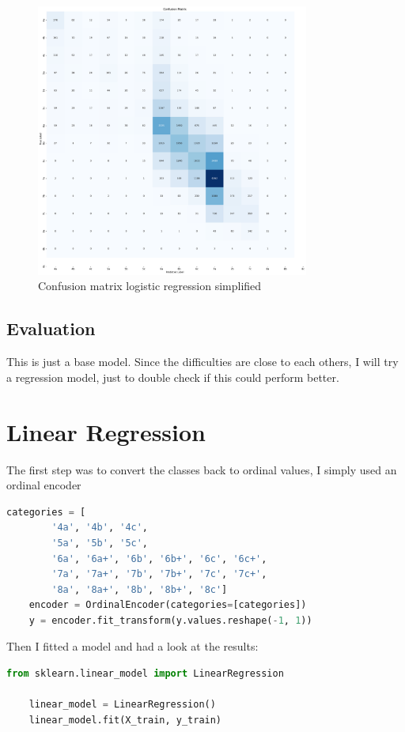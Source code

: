 \documentclass{article}
\begin{document}
\begin{figure}[H]
    \centering    
    \includegraphics[width=0.8\textwidth]{../Models/LogisticRegression/confusion_matrix2.pdf}
    \caption{Confusion matrix logistic regression simplified}\label{fig:conf_logreg2}
\end{figure}


\subsection{Evaluation}

This is just a base model. Since the difficulties are close to each others, I will try a regression model, just to double check if this could perform better.

\FloatBarrier\section{Linear Regression}
The first step was to convert the classes back to ordinal values, I simply used an ordinal encoder
\begin{lstlisting}[language=python, caption={Encode categories ordinal}]
    categories = [
        '4a', '4b', '4c', 
        '5a', '5b', '5c', 
        '6a', '6a+', '6b', '6b+', '6c', '6c+', 
        '7a', '7a+', '7b', '7b+', '7c', '7c+', 
        '8a', '8a+', '8b', '8b+', '8c']
    encoder = OrdinalEncoder(categories=[categories])
    y = encoder.fit_transform(y.values.reshape(-1, 1))
\end{lstlisting}

Then I fitted a model and had a look at the results:
\begin{lstlisting}[language=python, caption={Linear regression model}]
    from sklearn.linear_model import LinearRegression

    linear_model = LinearRegression()  
    linear_model.fit(X_train, y_train)
\end{lstlisting}
\end{document}
